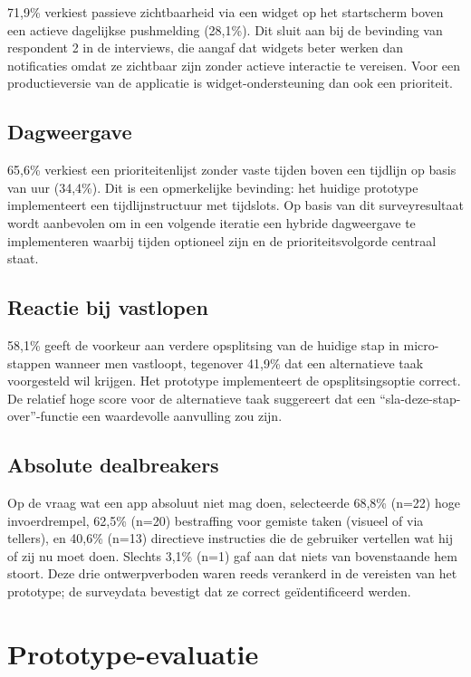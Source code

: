 71,9\% verkiest passieve zichtbaarheid via een widget op het startscherm boven
een actieve dagelijkse pushmelding (28,1\%). Dit sluit aan bij de bevinding van
respondent 2 in de interviews, die aangaf dat widgets beter werken dan
notificaties omdat ze zichtbaar zijn zonder actieve interactie te vereisen.
Voor een productieversie van de applicatie is widget-ondersteuning dan ook een
prioriteit.

\subsection{Dagweergave}

65,6\% verkiest een prioriteitenlijst zonder vaste tijden boven een tijdlijn op
basis van uur (34,4\%). Dit is een opmerkelijke bevinding: het huidige prototype
implementeert een tijdlijnstructuur met tijdslots. Op basis van dit surveyresultaat
wordt aanbevolen om in een volgende iteratie een hybride dagweergave te
implementeren waarbij tijden optioneel zijn en de prioriteitsvolgorde centraal
staat.

\subsection{Reactie bij vastlopen}

58,1\% geeft de voorkeur aan verdere opsplitsing van de huidige stap in
micro-stappen wanneer men vastloopt, tegenover 41,9\% dat een alternatieve taak
voorgesteld wil krijgen. Het prototype implementeert de opsplitsingsoptie correct.
De relatief hoge score voor de alternatieve taak suggereert dat een
``sla-deze-stap-over''-functie een waardevolle aanvulling zou zijn.

\subsection{Absolute dealbreakers}

Op de vraag wat een app absoluut niet mag doen, selecteerde 68,8\% (n=22) hoge
invoerdrempel, 62,5\% (n=20) bestraffing voor gemiste taken (visueel of via
tellers), en 40,6\% (n=13) directieve instructies die de gebruiker vertellen
wat hij of zij nu moet doen. Slechts 3,1\% (n=1) gaf aan dat niets van
bovenstaande hem stoort. Deze drie ontwerpverboden waren reeds verankerd in de
vereisten van het prototype; de surveydata bevestigt dat ze correct
geïdentificeerd werden.

\section{Prototype-evaluatie}

